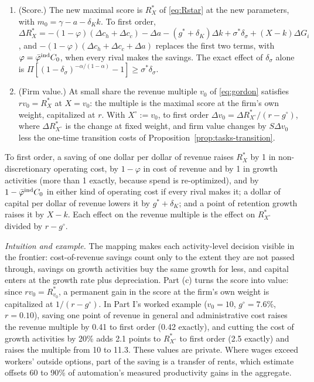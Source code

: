 \begin{proposition}[Aggregation]
\begin{enumerate}
\item[(b)] (Score.) The new maximal score is $R_X^*$ of \eqref{eq:Rstar} at the new parameters, with $m_0=\gamma-a-\delta_Kk$. To first order, $\Delta R_X^*=-(1-\varphi)(\Delta c_h+\Delta c_c)-\Delta a-(g^*+\delta_K)\Delta k+\sigma^*\delta_\sigma+(X-k)\Delta G_i$, and $-(1-\varphi)(\Delta c_h+\Delta c_c+\Delta a)$ replaces the first two terms, with $\varphi=\bar\varphi^{\rm ind}C_0$, when every rival makes the savings. The exact effect of $\delta_\sigma$ alone is $\Pi[(1-\delta_\sigma)^{-\alpha/(1-\alpha)}-1]\ge\sigma^*\delta_\sigma$.
\item[(c)] (Firm value.) At small share the revenue multiple $v_0$ of \eqref{eq:gordon} satisfies $rv_0=R^*_X$ at $X=v_0$: the multiple is the maximal score at the firm's own weight, capitalized at $r$. With $X^\circ:=v_0$, to first order $\Delta v_0=\Delta R^*_{X^\circ}/(r-g^\circ)$, where $\Delta R^*_{X^\circ}$ is the change at fixed weight, and firm value changes by $S\Delta v_0$ less the one-time transition costs of Proposition~\ref{prop:tasks-transition}.
\end{enumerate}
\end{proposition}

\begin{corollary}\label{cor:tasks-weights}
To first order, a saving of one dollar per dollar of revenue raises $R_X^*$ by 1 in non-discretionary operating cost, by $1-\varphi$ in cost of revenue and by 1 in growth activities (more than 1 exactly, because spend is re-optimized), and by $1-\bar\varphi^{\rm ind}C_0$ in either kind of operating cost if every rival makes it; a dollar of capital per dollar of revenue lowers it by $g^*+\delta_K$; and a point of retention growth raises it by $X-k$. Each effect on the revenue multiple is the effect on $R^*_{X^\circ}$ divided by $r-g^\circ$.
\end{corollary}

\noindent\emph{Intuition and example.} The mapping makes each activity-level decision visible in the frontier: cost-of-revenue savings count only to the extent they are not passed through, savings on growth activities buy the same growth for less, and capital enters at the growth rate plus depreciation. Part (c) turns the score into value: since $rv_0=R^*_{v_0}$, a permanent gain in the score at the firm's own weight is capitalized at $1/(r-g^\circ)$. In Part I's worked example ($v_0=10$, $g^\circ=7.6\%$, $r=0.10$), saving one point of revenue in general and administrative cost raises the revenue multiple by 0.41 to first order (0.42 exactly), and cutting the cost of growth activities by 20\% adds 2.1 points to $R^*_{X^\circ}$ to first order (2.5 exactly) and raises the multiple from 10 to 11.3. These values are private. Where wages exceed workers' outside options, part of the saving is a transfer of rents, which \citet{acemoglu2026automation} estimate offsets 60 to 90\% of automation's measured productivity gains in the aggregate.

